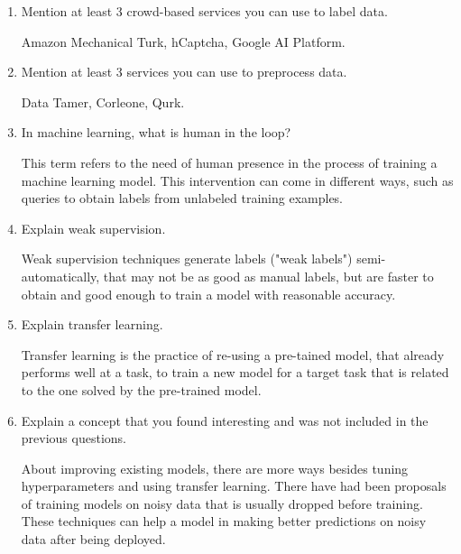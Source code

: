 \documentclass[]{article}
\begin{document}
\begin{enumerate}
    \item Mention at least 3 crowd-based services you can use to label data.
    
    Amazon Mechanical Turk, hCaptcha, Google AI Platform.

    \item Mention at least 3 services you can use to preprocess data.
    
    Data Tamer, Corleone, Qurk.

    \item In machine learning, what is human in the loop?
    
    This term refers to the need of human presence in the process of training a machine learning model. This 
    intervention can come in different ways, such as queries to obtain labels from unlabeled training examples.

    \item Explain weak supervision.
    
    Weak supervision techniques generate labels ("weak labels") semi-automatically, that may not be as good as 
    manual labels, but are faster to obtain and good enough to train a model with reasonable accuracy.

    \item Explain transfer learning.
    
    Transfer learning is the practice of re-using a pre-tained model, that already performs well at a task, to 
    train a new model for a target task that is related to the one solved by the pre-trained model.
    
    \item Explain a concept that you found interesting and was not included in the previous questions.
    
    About improving existing models, there are more ways besides tuning hyperparameters and using transfer learning. There have had been 
    proposals of training models on noisy data that is usually dropped before training. These techniques can help a model in making better
    predictions on noisy data after being deployed.


\end{enumerate}
\end{document}
